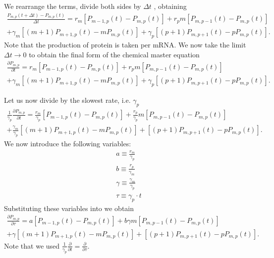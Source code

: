 We rearrange the terms, divide both sides by $\Delta t$ , obtaining
\begin{equation}
  \begin{aligned}
\frac{P_{m,p}(t + \Delta t) - P_{m,p}(t)}{\Delta t} =
r_m \left[ P_{m-1,p}(t) - P_{m,p}(t) \right]
+ r_p m \left[ P_{m, p-1}(t) - P_{m, p}(t) \right]\\
+ \gamma_m \left[ (m + 1) P_{m+1,p}(t) - m P_{m, p}(t) \right]
+ \gamma_p \left[ (p + 1) P_{m, p+1}(t) - p P_{m, p}(t) \right].
  \end{aligned}
\end{equation}
Note that the production of protein is taken per mRNA.
We now take the limit $\Delta t \rightarrow 0$ to obtain the final form of the
chemical master equation
\begin{equation}
  \begin{aligned}
\frac{\partial P_{m,p}}{\partial t} =
r_m \left[ P_{m-1,p}(t) - P_{m,p}(t) \right] +
r_p m \left[ P_{m, p-1}(t) - P_{m, p}(t) \right]\\
+ \gamma_m \left[ (m + 1) P_{m+1,p}(t)
- m P_{m, p}(t) \right]
+ \gamma_p \left[ (p + 1) P_{m, p+1}(t) - p P_{m, p}(t) \right].
  \end{aligned}
\end{equation}


Let us now divide by the slowest rate, i.e. $\gamma_p$
\begin{equation}
\begin{aligned}
\frac{1}{\gamma_p} \frac{\partial P_{m,p}}{\partial t} =
\frac{r_m}{\gamma_p} \left[ P_{m-1,p}(t) - P_{m,p}(t) \right]
+ \frac{r_p}{\gamma_p} m  \left[ P_{m, p-1}(t) - P_{m, p}(t) \right]\\
+ \frac{\gamma_m}{\gamma_p} \left[ (m + 1) P_{m+1,p}(t) - m P_{m, p}(t) \right]
+ \left[ (p + 1) P_{m, p+1}(t) - p P_{m, p}(t) \right].
\end{aligned}
\label{eq_cme_over_gammap}
\end{equation}
We now introduce the following variables:
\begin{align}
  a \equiv \frac{r_m}{\gamma_p}\\
  b \equiv \frac{r_p}{\gamma_m}\\
  \gamma \equiv \frac{\gamma_m}{\gamma_p}\\
  \tau \equiv \gamma_p \cdot t
\end{align}
Substituting these variables into  we obtain
\begin{equation}
\begin{aligned}
\frac{\partial P_{m,p}}{\partial \tau} =
a \left[ P_{m-1,p}(t) - P_{m,p}(t) \right]
+ b \gamma m  \left[ P_{m, p-1}(t) - P_{m, p}(t) \right]\\
+ \gamma \left[ (m + 1) P_{m+1,p}(t) - m P_{m, p}(t) \right]
+ \left[ (p + 1) P_{m, p+1}(t) - p P_{m, p}(t) \right].
\end{aligned}
\label{eq_cme_tau}
\end{equation}
Note that we used $\frac{1}{\gamma_p}\frac{\partial}{\partial t} =
\frac{\partial}{\partial \tau}$.

